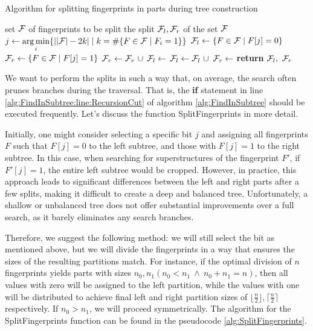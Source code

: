 \begin{algorithm}
  \caption{Algorithm for splitting fingerprints in parts during tree construction} \label{alg:SplitFingerprints}
  \begin{algorithmic}[1]
    \Require set $\mathcal{F}$ of fingerprints to be split
    \Ensure the split $\mathcal{F}_l, \mathcal{F}_r$ of the set $\mathcal{F}$
      \State $j \gets \operatorname*{arg\,min}\limits_{i}\{ \left| |\mathcal{F}| - 2k \right| \mid k = \# \{F \in \mathcal{F} \mid F_i = 1 \} \}$ %
      \State $\mathcal{F}_l \gets \{F \in \mathcal{F} \mid F[j] = 0\}$
      \State $\mathcal{F}_r \gets \{F \in \mathcal{F} \mid F[j] = 1\}$ 
	\State $\F_r \gets \F_r \ \cup$ 
	\State $\mathcal{F}_l \gets $  
	\State $\mathcal{F}_l \gets \mathcal{F}_l \ \cup$ 
	\State $\mathcal{F}_r \gets $  
      \EndIf
      \State \textbf{return} $\mathcal{F}_l, \ \mathcal{F}_r$ 
    \EndProcedure
  \end{algorithmic}
\end{algorithm}

We want to perform the splits in such a way that, on average, the search often prunes branches during the traversal. 
That is, the {\bf if} statement in line \ref{alg:FindInSubtree:line:RecursionCut} of algorithm \ref{alg:FindInSubtree} 
should be executed frequently. Let's discuss the function SplitFingerprints in more detail.

Initially, one might consider selecting a specific bit $j$ and assigning all fingerprints $F$ such that $F[j] = 0$ to 
the left subtree, and those with $F[j] = 1$ to the right subtree. In this case, when searching for superstructures of 
the fingerprint $F'$, if $F'[j] = 1$, the entire left subtree would be cropped. However, in practice, this approach leads 
to significant differences between the left and right parts after a few splits, making it difficult to create a deep and 
balanced tree. Unfortunately, a shallow or unbalanced tree does not offer substantial improvements over a full search, 
as it barely eliminates any search branches.

Therefore, we suggest the following method: we will still select the bit as mentioned above, but we will divide the 
fingerprints in a way that ensures the sizes of the resulting partitions match. For instance, if the optimal division 
of $n$ fingerprints yields parts with sizes $n_0, n_1 (n_0 < n_1 \ \land \ n_0 + n_1 = n)$, then all values with zero 
will be assigned to the left partition, while the values with one will be distributed to achieve final left and right 
partition sizes of $\lfloor\frac{n}{2}\rfloor, \lceil \frac{n}{2} \rceil$ respectively. If $n_0 > n_1$, we will proceed 
symmetrically. The algorithm for the SplitFingerprints function can be found in the pseudocode \ref{alg:SplitFingerprints}.
